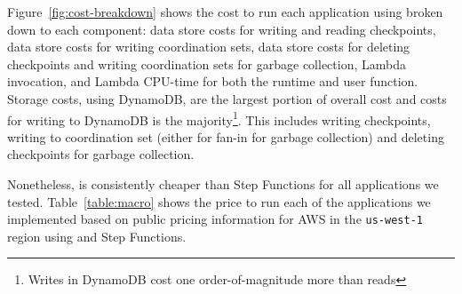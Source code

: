 Figure~\ref{fig:cost-breakdown} shows the cost to run each application using
\name{} broken down to each component: data store costs for writing and
reading checkpoints, data store costs for writing coordination sets, data
store costs for deleting checkpoints and writing coordination sets for garbage
collection, Lambda invocation, and Lambda CPU-time for both the \name{}
runtime and user function. Storage costs, using DynamoDB, are the largest
portion of overall cost and costs for writing to DynamoDB is the majority\footnote{Writes in DynamoDB cost one order-of-magnitude more than reads}. This includes writing checkpoints, writing to coordination set (either for fan-in for garbage collection) and deleting checkpoints for garbage collection.

Nonetheless, \name{} is consistently cheaper than Step Functions for all
applications we tested. Table~\ref{table:macro} shows the price to run each of
the applications we implemented based on public pricing information for AWS in
the \texttt{us-west-1} region using \name{} and Step Functions.


%
%

